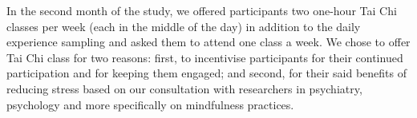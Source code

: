 In the second month of the study, we offered participants two one-hour Tai Chi classes per week (each in the middle of the day) in addition to the daily experience sampling and asked them to attend one class a week. We chose to offer Tai Chi class for two reasons: first, to incentivise participants for their continued participation and for keeping them engaged; and second, for their said benefits of reducing stress based on our consultation with researchers in psychiatry, psychology and more specifically on mindfulness practices. 

